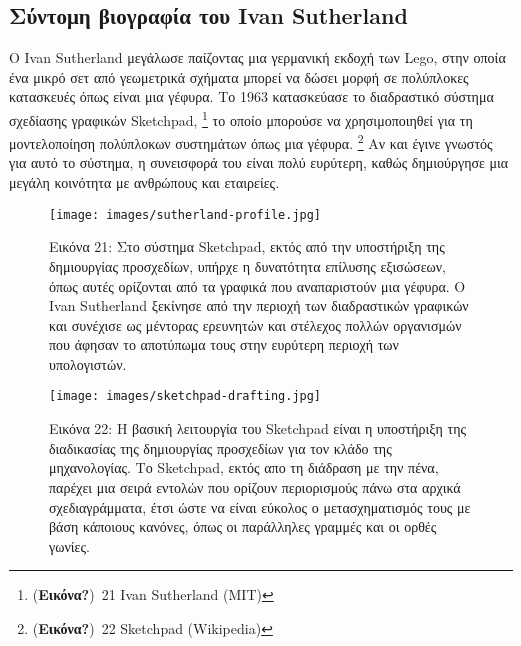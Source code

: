 \documentclass[
]{article}
\begin{document}
\hypertarget{ux3c3ux3cdux3bdux3c4ux3bfux3bcux3b7-ux3b2ux3b9ux3bfux3b3ux3c1ux3b1ux3c6ux3afux3b1-ux3c4ux3bfux3c5-ivan-sutherland}{%
\subsection{Σύντομη βιογραφία του Ivan
Sutherland}\label{ux3c3ux3cdux3bdux3c4ux3bfux3bcux3b7-ux3b2ux3b9ux3bfux3b3ux3c1ux3b1ux3c6ux3afux3b1-ux3c4ux3bfux3c5-ivan-sutherland}}

Ο Ivan Sutherland μεγάλωσε παίζοντας μια γερμανική εκδοχή των Lego, στην
οποία ένα μικρό σετ από γεωμετρικά σχήματα μπορεί να δώσει μορφή σε
πολύπλοκες κατασκευές όπως είναι μια γέφυρα. Το 1963 κατασκεύασε το
διαδραστικό σύστημα σχεδίασης γραφικών Sketchpad, \footnote{(\textbf{Εικόνα?})~21
  Ivan Sutherland (MIT)} το οποίο μπορούσε να χρησιμοποιηθεί για τη
μοντελοποίηση πολύπλοκων συστημάτων όπως μια γέφυρα. \footnote{(\textbf{Εικόνα?})~22
  Sketchpad (Wikipedia)} Αν και έγινε γνωστός για αυτό το σύστημα, η
συνεισφορά του είναι πολύ ευρύτερη, καθώς δημιούργησε μια μεγάλη
κοινότητα με ανθρώπους και εταιρείες.

\leavevmode{}%
\begin{figure}
\hypertarget{fig:sutherland-profile}{%
\centering
\texttt{[image: images/sutherland-profile.jpg]}
\caption{Εικόνα 21: Στο σύστημα Sketchpad, εκτός από την υποστήριξη της
δημιουργίας προσχεδίων, υπήρχε η δυνατότητα επίλυσης εξισώσεων, όπως
αυτές ορίζονται από τα γραφικά που αναπαριστούν μια γέφυρα. O Ivan
Sutherland ξεκίνησε από την περιοχή των διαδραστικών γραφικών και
συνέχισε ως μέντορας ερευνητών και στέλεχος πολλών οργανισμών που άφησαν
το αποτύπωμα τους στην ευρύτερη περιοχή των
υπολογιστών.}\label{fig:sutherland-profile}
}
\end{figure}

\leavevmode{}%
\begin{figure}
\hypertarget{fig:sketchpad-drafting}{%
\centering
\texttt{[image: images/sketchpad-drafting.jpg]}
\caption{Εικόνα 22: Η βασική λειτουργία του Sketchpad είναι η υποστήριξη
της διαδικασίας της δημιουργίας προσχεδίων για τον κλάδο της
μηχανολογίας. Το Sketchpad, εκτός απο τη διάδραση με την πένα, παρέχει
μια σειρά εντολών που ορίζουν περιορισμούς πάνω στα αρχικά
σχεδιαγράμματα, έτσι ώστε να είναι εύκολος ο μετασχηματισμός τους με
βάση κάποιους κανόνες, όπως οι παράλληλες γραμμές και οι ορθές
γωνίες.}\label{fig:sketchpad-drafting}
}
\end{figure}
\end{document}
